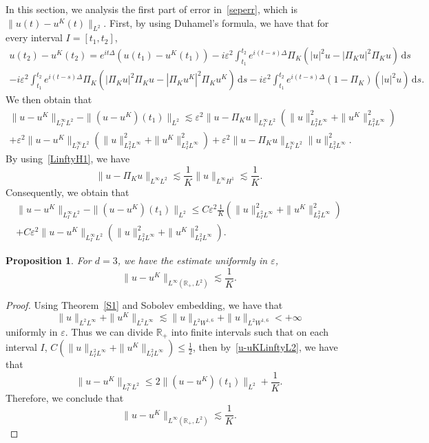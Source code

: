 \documentclass[10pt,a4paper]{article}
\newtheorem{proposition}[theorem]{Proposition}
\begin{document}
  In this section, we analysis the first part of error in~\eqref{seperr}, which
  is \(\|u(t)-u^K(t)\|_{L^2}\). First, by using Duhamel's formula, we have
  that for every interval \(I = [t_1 , t_2]\),
  \begin{multline}
    u(t_2) - u^K(t_2) = e^{it\Delta}(u(t_1) - u^K(t_1))  
    - i \varepsilon^2 \int_{t_1}^{t_2} e^{i(t-s)\Delta} \Pi_K (|u|^2u 
    - |\Pi_K u|^2\Pi_K u) \,\mathrm{d}s \\ 
    - i \varepsilon^2 \int_{t_1}^{t_2} e^{i(t-s)\Delta} \Pi_K (|\Pi_K u|^2\Pi_K u 
    - |\Pi_K u^K|^2\Pi_K u^K) \,\mathrm{d}s  
    - i \varepsilon^2 \int_{t_1}^{t_2} e^{i(t-s)\Delta} (1 - \Pi_K)(|u|^2u) 
    \,\mathrm{d}s .
  \end{multline}
  We then obtain that
  \begin{multline}
    \|u-u^K\|_{L^{\infty}_{I}L^2} - \|(u-u^K)(t_1)\|_{L^2} \lesssim
    \varepsilon^2 \| u - \Pi_K u \|_{L^{\infty}_{I}L^2} ( \|u\|^2_{L^2_{I}L^{\infty}} + 
    \|u^K\|^2_{L^2_{I}L^{\infty}} ) \\
    + \varepsilon^2 \| u - u^K \|_{L^{\infty}_{I}L^2} ( \|u\|^2_{L^2_{I}L^{\infty}} + 
    \|u^K\|^2_{L^2_{I}L^{\infty}} ) + \varepsilon^2 \| u - \Pi_K u \|_{L^{\infty}_{I}L^2} 
    \|u\|^2_{L^2_{I}L^{\infty}}.
  \end{multline}
  By using~\eqref{LinftyH1}, we have 
  \[ \|u-\Pi_K u\|_{L^\infty L^2} \lesssim \frac1K \|u\|_{L^\infty H^1} \lesssim
  \frac1K. \]
  Consequently, we obtain that 
  \begin{multline}\label{u-uKLinftyL2}
    \|u-u^K\|_{L^\infty_I L^2} - \|(u-u^K)(t_1)\|_{L^2} \leq C
    \varepsilon^2 \frac1K (\|u\|^2_{L^2_I L^\infty} + 
    \|u^K\|^2_{L^2_I L^\infty} ) \\
    + C \varepsilon^2 \| u - u^K \|_{L^\infty_I L^2} ( \|u\|^2_{L^2_I L^\infty} + 
    \|u^K\|^2_{L^2_I L^\infty} ).
  \end{multline}


  \begin{proposition}\label{u-uKLinftyL2d3}
    For \(d=3\), we have the estimate uniformly in \(\varepsilon\),
    \begin{equation}
      \|u-u^K\|_{L^\infty({\mathbb R_+},L^2)} \lesssim \frac1K.
    \end{equation}
  \end{proposition}

  \begin{proof}
    Using Theorem~\ref{S1} and Sobolev embedding, we have that 
    \[ \|u\|_{L^2L^\infty}+\|u^K\|_{L^2L^\infty} \lesssim \|u\|_{L^2W^{1,6}} +
    \|u\|_{L^2W^{1,6}} < +\infty \]
    uniformly in \(\varepsilon\). Thus we can divide \(\mathbb R_+\) into finite 
    intervals such that on each interval \(I\), \(C (\|u\|_{L^2_I L^\infty} + 
    \|u^K\|_{L^2_I L^\infty}) \leq \frac12\), then by~\eqref{u-uKLinftyL2}, we
    have that 
    \[ \|u-u^K\|_{L^\infty_I L^2} \leq 2\|(u-u^K)(t_1)\|_{L^2} + \frac1K. \]
    Therefore, we conclude that 
    \[ \|u-u^K\|_{L^\infty({\mathbb R_+},L^2)} \lesssim \frac1K. \]
  \end{proof}
\end{document}
